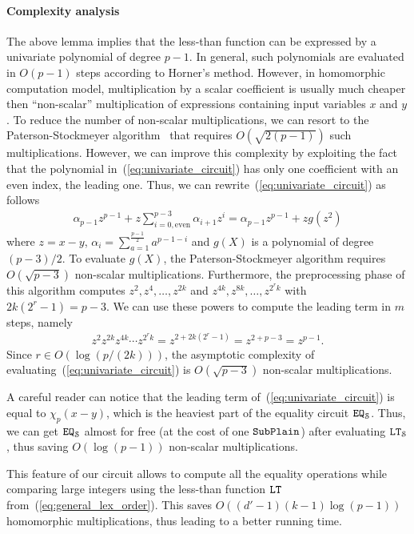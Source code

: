   \paragraph{Complexity analysis}The above lemma implies that the less-than function can be expressed by a univariate polynomial of degree $p-1$.
  In general, such polynomials are evaluated in $O(p-1)$ steps according to Horner's method.
  However, in homomorphic computation model, multiplication by a scalar coefficient is usually much cheaper then ``non-scalar'' multiplication of expressions containing input variables $x$ and $y$.
  To reduce the number of non-scalar multiplications, we can resort to the Paterson-Stockmeyer algorithm~\cite{SIAM:PS73} that requires $O(\sqrt{2(p-1)})$ such multiplications.
  However, we can improve this complexity by exploiting the fact that the polynomial in~(\ref{eq:univariate_circuit}) has only one coefficient with an even index, the leading one.
  Thus, we can rewrite~(\ref{eq:univariate_circuit}) as follows
  \begin{align*}
    \alpha_{p-1} z^{p-1} + z \sum_{i=0, \text{even}}^{p-3} \alpha_{i+1} z^i =  \alpha_{p-1} z^{p-1} + z g(z^2)
  \end{align*}
  where $z = x - y$, $\alpha_i = \sum_{a=1}^{\frac{p-1}{2}} a^{p-1-i}$ and $g(X)$ is a polynomial of degree $(p-3)/2$.
  To evaluate $g(X)$, the Paterson-Stockmeyer algorithm requires $O(\sqrt{p-3})$ non-scalar multiplications.
  Furthermore, the preprocessing phase of this algorithm computes $z^2, z^4, \dots, z^{2k}$ and $z^{4k}, z^{8k}, \dots, z^{2^r k}$ with $2k(2^r-1) = p-3$.
  We can use these powers to compute the leading term in $m$ steps, namely
  \begin{align*}
    z^2 z^{2k} z^{4k} \cdots z^{2^r k} = z^{2 + 2k(2^r-1)} = z^{2 + p - 3} = z^{p-1}.
  \end{align*}
  Since $r \in O(\log (p/(2k)))$, the asymptotic complexity of evaluating~(\ref{eq:univariate_circuit}) is $O(\sqrt{p-3})$ non-scalar multiplications.
  
  \begin{remark}
    A careful reader can notice that the leading term of~(\ref{eq:univariate_circuit}) is equal to $\chi_p(x-y)$, which is the heaviest part of the equality circuit $\mathtt{EQ}_{\mathcal{S}}$.
    Thus, we can get $\mathtt{EQ}_{\mathcal{S}}$ almost for free (at the cost of one ${\mathtt{SubPlain}}$) after evaluating $\mathtt{LT}_{\mathcal{S}}$, thus saving $O(\log (p-1))$ non-scalar multiplications.

    This feature of our circuit allows to compute all the equality operations while comparing large integers using the less-than function $\mathtt{LT}$ from~(\ref{eq:general_lex_order}).
    This saves $O((d'-1)(k-1) \log (p-1))$ homomorphic multiplications, thus leading to a better running time.
  \end{remark}

